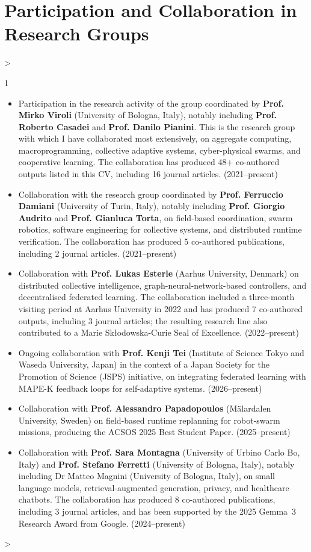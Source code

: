 \documentclass[10pt,a4paper,roman]{moderncv}        %
\makeatletter
\newenvironment{cvprose}%
  {\begin{list}{}{%
     \setlength{\leftmargin}{\dimexpr\hintscolumnwidth+\separatorcolumnwidth\relax}%
     \setlength{\rightmargin}{0pt}%
     \setlength{\listparindent}{0pt}%
     \setlength{\itemindent}{0pt}%
     \setlength{\labelwidth}{0pt}%
     \setlength{\topsep}{.25em}%
     \setlength{\parsep}{.5em}%
     \setlength{\partopsep}{0pt}}%
   \item\relax}%
  {\end{list}}
\newenvironment{cvlist}[1][2]%
  {\begin{cvprose}%
   \cvlist@cols=#1\relax
   \setlength{\multicolsep}{0pt}%
   \setlength{\columnsep}{1.2em}%
   \setlength{\columnwidth}{\linewidth}%
   \ifnum\cvlist@cols>\@ne\begin{multicols}{#1}\fi
   \begin{itemize}%
     \setlength{\itemsep}{.1ex}%
     \setlength{\parskip}{0pt}%
     \setlength{\topsep}{0pt}}%
  {\end{itemize}%
   \ifnum\cvlist@cols>\@ne\end{multicols}\fi
   \end{cvprose}}
\newcommand{\cvsection}[1]{\Needspace{6\baselineskip}\section{#1}}
\makeatother
\begin{document}
\cvsection{Participation and Collaboration in Research Groups}
\begin{cvlist}[1]
  \item Participation in the research activity of the group coordinated by \textbf{Prof. Mirko Viroli} (University of Bologna, Italy), notably including \textbf{Prof. Roberto Casadei} and \textbf{Prof. Danilo Pianini}. This is the research group with which I have collaborated most extensively, on aggregate computing, macroprogramming, collective adaptive systems, cyber-physical swarms, and cooperative learning. The collaboration has produced 48+ co-authored outputs listed in this CV, including 16 journal articles. (2021--present)
  \item Collaboration with the research group coordinated by \textbf{Prof. Ferruccio Damiani} (University of Turin, Italy), notably including \textbf{Prof. Giorgio Audrito} and \textbf{Prof. Gianluca Torta}, on field-based coordination, swarm robotics, software engineering for collective systems, and distributed runtime verification. The collaboration has produced 5 co-authored publications, including 2 journal articles. (2021--present)
  \item Collaboration with \textbf{Prof. Lukas Esterle} (Aarhus University, Denmark) on distributed collective intelligence, graph-neural-network-based controllers, and decentralised federated learning. The collaboration included a three-month visiting period at Aarhus University in 2022 and has produced 7 co-authored outputs, including 3 journal articles; the resulting research line also contributed to a Marie Sk\l{}odowska-Curie Seal of Excellence. (2022--present)
  \item Ongoing collaboration with \textbf{Prof. Kenji Tei} (Institute of Science Tokyo and Waseda University, Japan) in the context of a Japan Society for the Promotion of Science (JSPS) initiative, on integrating federated learning with MAPE-K feedback loops for self-adaptive systems. (2026--present)
  \item Collaboration with \textbf{Prof. Alessandro Papadopoulos} (M\"alardalen University, Sweden) on field-based runtime replanning for robot-swarm missions, producing the ACSOS 2025 Best Student Paper. (2025--present)
  \item Collaboration with \textbf{Prof. Sara Montagna} (University of Urbino Carlo Bo, Italy) and \textbf{Prof. Stefano Ferretti} (University of Bologna, Italy), notably including Dr Matteo Magnini (University of Bologna, Italy), on small language models, retrieval-augmented generation, privacy, and healthcare chatbots. The collaboration has produced 8 co-authored publications, including 3 journal articles, and has been supported by the 2025 Gemma~3 Research Award from Google. (2024--present)

\end{cvlist}
\end{document}
